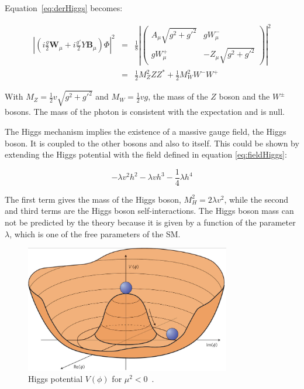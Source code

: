       Equation~\ref{eq:derHiggs} becomes:

      \begin{equation}
        \begin{array}{rcl}
       \left|\left(i\frac{g}{2}\textbf{W}_{\mu} +i\frac{g'}{2}Y\textbf{B}_{\mu}\right) \Phi \right|^2 & = & \frac{1}{8} \left| 
          \begin{pmatrix}
            A_{\mu}\sqrt{g^2 + g'^2} & gW^-_{\mu} \\
            gW^+_{\mu} & -Z_{\mu}\sqrt{g^2 + g'^2}
          \end{pmatrix}
       \right|^2 \\
        & = & \frac{1}{2}M^2_Z ZZ^* + \frac{1}{2}M^2_W W^-W^+
        \end{array}
      \end{equation}

      With $M_Z = \frac{1}{2}v\sqrt{g^2 + g'^2}$ and $M_W = \frac{1}{2} vg$, the mass of the $Z$ boson and the $W^{\pm}$ bosons. 
      The mass of the photon is consistent with the expectation and is null. 

      The Higgs mechanism implies the existence of a massive gauge field, the Higgs boson.
      It is coupled to the other bosons and also to itself.
      This could be shown by extending the Higgs potential with the field defined in equation \ref{eq:fieldHiggs}:

      \begin{equation}
        -\lambda v^2h^2 - \lambda v h^3 - \frac{1}{4}\lambda h^4
      \end{equation}

      The first term gives the mass of the Higgs boson, $M^2_H = 2\lambda v^2$, while the second and third terms are the Higgs boson self-interactions.
      The Higgs boson mass can not be predicted by the theory because it is given by a function of the parameter $\lambda$, which is one of the free parameters of the \gls{SM}.
      
      \begin{figure}[!h]
        \centering
        \includegraphics[width = 0.8\textwidth]{Pictures/SM/higgsPotential.png}
        \caption{Higgs potential $V(\phi)$ for $\mu^2 < 0$~\cite{deBoer:2013pud}.}
        \label{fig:scalarPotential}
      \end{figure}

